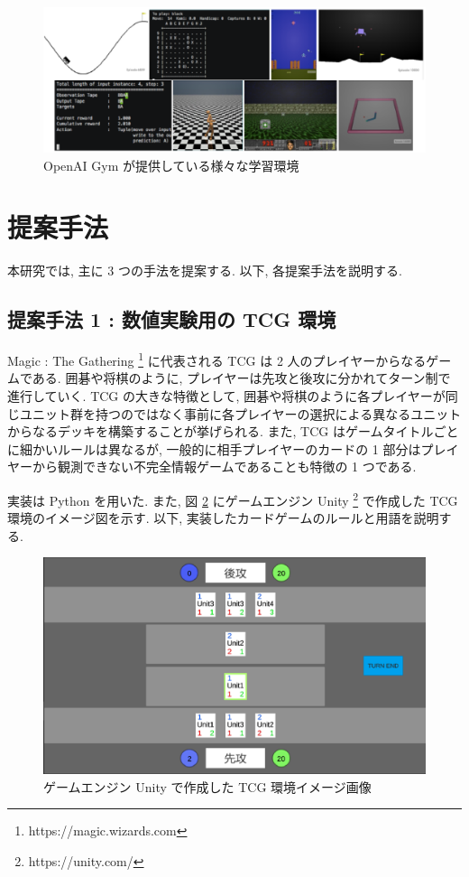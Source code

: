 \documentclass[12pt]{jarticle}
\begin{document}
  \begin{figure}[ht]
    \centering
    \includegraphics[width=180mm]{assets/OpenAiGym.eps}
    \vspace{-0.3cm}
    \caption{OpenAI Gym が提供している様々な学習環境}
    \label{fig:OpenAIGymSample}
  \end{figure}
  

\clearpage
\section{提案手法}
本研究では, 主に 3 つの手法を提案する. 以下, 各提案手法を説明する.

\subsection{提案手法 1 : 数値実験用の TCG 環境}
Magic : The Gathering \footnote[1]{https://magic.wizards.com} に代表される TCG は 2 人のプレイヤーからなるゲームである. 囲碁や将棋のように, プレイヤーは先攻と後攻に分かれてターン制で進行していく. TCG の大きな特徴として, 囲碁や将棋のように各プレイヤーが同じユニット群を持つのではなく事前に各プレイヤーの選択による異なるユニットからなるデッキを構築することが挙げられる. また, TCG はゲームタイトルごとに細かいルールは異なるが, 一般的に相手プレイヤーのカードの 1 部分はプレイヤーから観測できない不完全情報ゲームであることも特徴の 1 つである. 

実装は Python を用いた.
また, 図 \ref{fig:CardGameDemo} にゲームエンジン Unity \footnote[2]{https://unity.com/} で作成した TCG 環境のイメージ図を示す.
以下, 実装したカードゲームのルールと用語を説明する. 
\vspace{-0.3cm}
\begin{figure}[ht]
  \centering
  \includegraphics[width=170mm]{assets/cardgamedemo.eps}
  \vspace{-0.3cm}
  \caption{ゲームエンジン Unity で作成した TCG 環境イメージ画像}
  \label{fig:CardGameDemo}
\end{figure}
\end{document}
